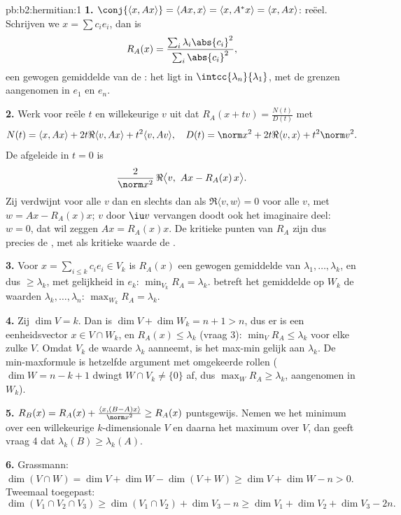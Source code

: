 \begin{solution}{pb:b2:hermitian:1}
\textbf{1.} $\conj{\langle x, Ax\rangle} = \langle Ax, x\rangle
= \langle x, A^*x\rangle = \langle x, Ax\rangle$: reëel. Schrijven
we $x = \sum c_ie_i$, dan is
\[
R_A(x) = \frac{\sum_i\lambda_i\abs{c_i}^2}
{\sum_i\abs{c_i}^2} ,
\]
een gewogen gemiddelde van de : het ligt in
$\intcc{\lambda_n}{\lambda_1}$, met de grenzen aangenomen in $e_1$
en $e_n$.

\textbf{2.} Werk voor reële $t$ en willekeurige $v$ uit dat $R_A(x
+ tv) = \frac{N(t)}{D(t)}$ met
\[
N(t) = \langle x, Ax\rangle + 2t\Re\langle v, Ax\rangle +
t^2\langle v, Av\rangle,
\quad
D(t) = \norm x^2 + 2t\Re\langle v, x\rangle + t^2\norm v^2 .
\]
De afgeleide in $t = 0$ is
\[
\frac{2}{\norm x^2}\,
\Re\bigl\langle v,\ Ax - R_A(x)\,x\bigr\rangle .
\]
Zij verdwijnt voor alle $v$ dan en slechts dan als $\Re\langle v,
w\rangle = 0$ voor alle $v$, met $w = Ax - R_A(x)x$; $v$ door $\iu
v$ vervangen doodt ook het imaginaire deel: $w = 0$, dat wil zeggen
$Ax = R_A(x)x$. De kritieke punten van $R_A$ zijn dus precies de
, met als kritieke waarde de .

\textbf{3.} Voor $x = \sum_{i\leq k}c_ie_i \in V_k$ is $R_A(x)$
een gewogen gemiddelde van $\lambda_1, \dots, \lambda_k$, en dus
$\geq \lambda_k$, met gelijkheid in $e_k$: $\min_{V_k} R_A =
\lambda_k$.  betreft het gemiddelde op $W_k$ de waarden
$\lambda_k, \dots, \lambda_n$: $\max_{W_k}R_A = \lambda_k$.

\textbf{4.} Zij $\dim V = k$. Dan is $\dim V + \dim W_k = n + 1 >
n$, dus er is een eenheidsvector $x \in V \cap W_k$, en $R_A(x)
\leq \lambda_k$ (vraag 3): $\min_{V}R_A \leq \lambda_k$ voor elke
zulke $V$. Omdat $V_k$ de waarde $\lambda_k$ aanneemt, is het
max-min gelijk aan $\lambda_k$. De min-maxformule is hetzelfde
argument met omgekeerde rollen ($\dim W = n - k + 1$ dwingt $W \cap
V_k \neq \{0\}$ af, dus $\max_W R_A \geq \lambda_k$, aangenomen in
$W_k$).

\textbf{5.} $R_B(x) = R_A(x) + \frac{\langle x, (B-A)x\rangle}
{\norm x^2} \geq R_A(x)$ puntsgewijs. Nemen we het minimum over
een willekeurige $k$-dimensionale $V$ en daarna het maximum over
$V$, dan geeft vraag 4 dat $\lambda_k(B) \geq \lambda_k(A)$.

\textbf{6.} Grassmann: $\dim(V\cap W) = \dim V + \dim W - \dim(V +
W) \geq \dim V + \dim W - n > 0$. Tweemaal toegepast:
\[
\dim(V_1\cap V_2\cap V_3)
\geq \dim(V_1\cap V_2) + \dim V_3 - n
\geq \dim V_1 + \dim V_2 + \dim V_3 - 2n .
\]


\end{solution}
